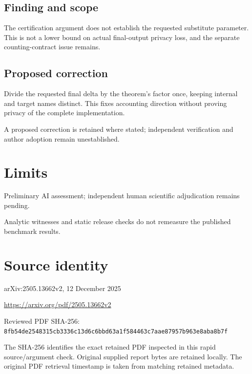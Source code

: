 \documentclass[11pt]{article}
\begin{document}
\subsection*{Finding and scope}

The certification argument does not establish the requested substitute parameter. This is not a lower bound on actual final-output privacy loss, and the separate counting-contract issue remains.

\subsection*{Proposed correction}

Divide the requested final delta by the theorem’s factor once, keeping internal and target names distinct. This fixes accounting direction without proving privacy of the complete implementation.

A proposed correction is retained where stated; independent verification and author adoption remain unestablished.

\section*{Limits}

Preliminary AI assessment; independent human scientific adjudication remains pending.\par

Analytic witnesses and static release checks do not remeasure the published benchmark results.\par

\section*{Source identity}

arXiv:2505.13662v2, 12 December 2025

\url{https://arxiv.org/pdf/2505.13662v2}

Reviewed PDF SHA-256: \nolinkurl{8fb54de2548315cb3336c13d6c6bbd63a1f584463c7aae87957b963e8aba8b7f}

The SHA-256 identifies the exact retained PDF inspected in this rapid source/argument check. Original supplied report bytes are retained locally. The original PDF retrieval timestamp is taken from matching retained metadata.
\end{document}
